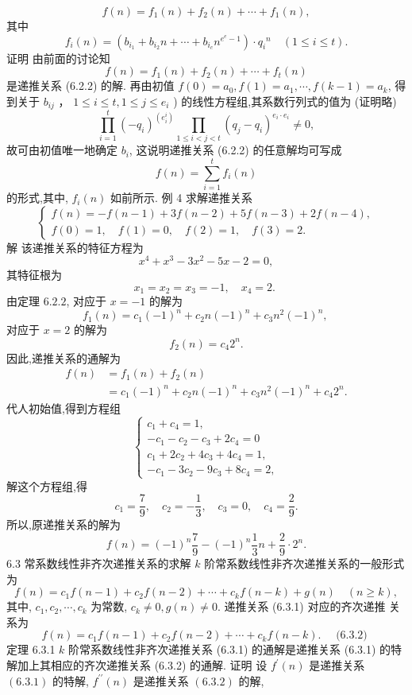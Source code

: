 \documentclass{report}
\begin{document}
	$$
	f(n)=f_1(n)+f_2(n)+\cdots+f_1(n),
	$$
	其中
	$$
	f_i(n)=\left(b_{i_1}+b_{i_2} n+\cdots+b_{i_c} n^{e^e-1}\right) \cdot q_i{ }^n \quad(1 \leqslant i \leqslant t) .
	$$
	证明 由前面的讨论知
	$$
	f(n)=f_1(n)+f_2(n)+\cdots+f_t(n)
	$$
	是递推关系 (6.2.2) 的解. 再由初值 $f(0)=a_0, f(1)=a_1, \cdots, f(k-1)=a_k$, 得 到关于 $b_{i j}$ ， $1 \leqslant i \leqslant t, 1 \leqslant j \leqslant e_i$ ) 的线性方程组,其系数行列式的值为 (证明略)
	$$
	\prod_{i=1}^t\left(-q_i\right)^{\left(e_i^i\right)} \prod_{1 \leqslant i<j<t}\left(q_j-q_i\right)^{e_i \cdot e_i} \neq 0,
	$$
	故可由初值唯一地确定 $b_i$, 这说明递推关系 (6.2.2) 的任意解均可写成
	$$
	f(n)=\sum_{i=1}^t f_i(n)
	$$
	的形式,其中, $f_i(n)$ 如前所示.
	例 4 求解递推关系
	$$
	\left\{\begin{array}{l}
	f(n)=-f(n-1)+3 f(n-2)+5 f(n-3)+2 f(n-4), \\
	f(0)=1, \quad f(1)=0, \quad f(2)=1, \quad f(3)=2 .
	\end{array}\right.
	$$
	解 该递推关系的特征方程为
	$$
	x^4+x^3-3 x^2-5 x-2=0,
	$$
	其特征根为
	$$
	x_1=x_2=x_3=-1, \quad x_4=2 \text {. }
	$$
	由定理 $6.2 .2$, 对应于 $x=-1$ 的解为
	$$
	f_1(n)=c_1(-1)^n+c_2 n(-1)^n+c_3 n^2(-1)^n \text {, }
	$$
	对应于 $x=2$ 的解为
	$$
	f_2(n)=c_4 2^n .
	$$
	因此,递推关系的通解为
	$$
	\begin{aligned}
	f(n) &=f_1(n)+f_2(n) \\
	&=c_1(-1)^n+c_2 n(-1)^n+c_3 n^2(-1)^n+c_4 2^n .
	\end{aligned}
	$$
	代人初始值,得到方程组
	$$
	\left\{\begin{array}{l}
	c_1+c_4=1, \\
	-c_1-c_2-c_3+2 c_4=0 \\
	c_1+2 c_2+4 c_3+4 c_4=1, \\
	-c_1-3 c_2-9 c_3+8 c_4=2,
	\end{array}\right.
	$$
	解这个方程组,得
	$$
	c_1=\frac{7}{9}, \quad c_2=-\frac{1}{3}, \quad c_3=0, \quad c_4=\frac{2}{9} .
	$$
	所以,原递推关系的解为
	$$
	f(n)=(-1)^n \frac{7}{9}-(-1)^n \frac{1}{3} n+\frac{2}{9} \cdot 2^n .
	$$
	6.3 常系数线性非齐次递推关系的求解
	$k$ 阶常系数线性非齐次递推关系的一般形式为
	$$
	f(n)=c_1 f(n-1)+c_2 f(n-2)+\cdots+c_k f(n-k)+g(n) \quad(n \geqslant k),
	$$
	其中, $c_1, c_2, \cdots, c_k$ 为常数, $c_k \neq 0, g(n) \neq 0$. 递推关系 (6.3.1) 对应的齐次递推 关系为
	$$
	f(n)=c_1 f(n-1)+c_2 f(n-2)+\cdots+c_k f(n-k) . \quad \text { (6.3.2) }
	$$
	定理 6.3.1 $k$ 阶常系数线性非齐次递推关系 (6.3.1) 的通解是递推关系 (6.3.1) 的特解加上其相应的齐次递推关系 (6.3.2) 的通解.
	证明 设 $f^{\prime}(n)$ 是递推关系 $(6.3 .1)$ 的特解, $f^{\prime \prime}(n)$ 是递推关系 $(6.3 .2)$ 的解,
\end{document}
